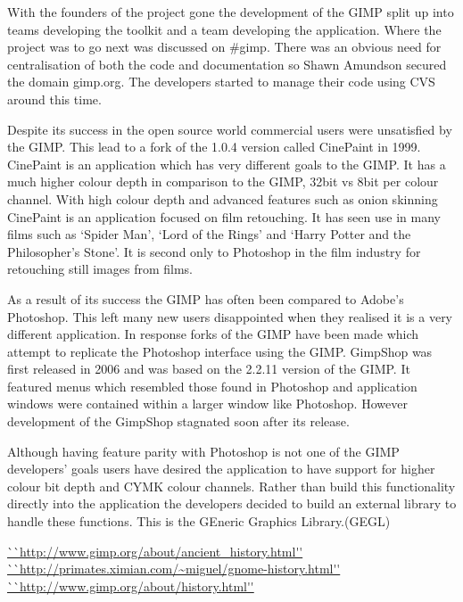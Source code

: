 \documentclass[a4 paper, 12pt]{article}
\begin{document}
	With the founders of the project gone the development of the GIMP split up
	into teams developing the toolkit and a team developing the application.
	Where the project was to go next was discussed on #gimp. There was an
	obvious need for centralisation of both the code and documentation so Shawn
	Amundson secured the domain gimp.org. The developers started to manage their
	code using CVS around this time.

	Despite its success in the open source world commercial users were unsatisfied
	by the GIMP. This lead to a fork of the 1.0.4 version called CinePaint in
	1999.\cite{release} CinePaint is an application which has very different
	goals to the GIMP. It has a much higher colour depth in comparison to the
	GIMP, 32bit vs 8bit per colour channel. With high colour depth and advanced
	features such as onion skinning CinePaint is an application focused on film
	retouching. It has seen use in many films such as `Spider Man', `Lord of the
	Rings' and `Harry Potter and the Philosopher's Stone'. It is second only to
	Photoshop in the film industry for retouching still images from films.
	
	

	As a result of its success the GIMP has often been compared to Adobe's
	Photoshop. This left many new users disappointed when they realised it is a
	very different application. In response forks of the GIMP have been made
	which attempt to replicate the Photoshop interface using the GIMP. GimpShop
	was first released in 2006 and was based on the 2.2.11 version of the GIMP.
	It featured menus which resembled those found in Photoshop and application
	windows were contained within a larger window like Photoshop. However
	development of the GimpShop stagnated soon after its release.

	Although having feature parity with Photoshop is not one of the GIMP
	developers' goals users have desired the application to have support for
	higher colour bit depth and CYMK colour channels. Rather than build this
	functionality directly into the application the developers decided to build
	an external library to handle these functions. This is the GEneric Graphics
	Library.(GEGL)
\begin{thebibliography}{12}
		\url{``http://www.gimp.org/about/ancient_history.html''}
		\url{``http://primates.ximian.com/~miguel/gnome-history.html''}
		\url{``http://www.gimp.org/about/history.html''}
\end{thebibliography}
\end{document}
